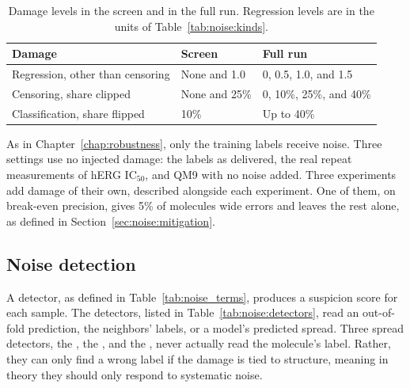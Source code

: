 \begin{table}[htbp]
\centering
\small
\begin{tabular}{@{}lll@{}}
\toprule
Damage & Screen & Full run \\
\midrule
Regression, other than censoring & None and 1.0 & 0, 0.5, 1.0, and 1.5 \\
Censoring, share clipped & None and 25\% & 0, 10\%, 25\%, and 40\% \\
Classification, share flipped & 10\% & Up to 40\% \\
\bottomrule
\end{tabular}
\caption[Damage levels.]{Damage levels in the screen and in the full run. Regression levels are in the units of Table~\ref{tab:noise:kinds}.}
\label{tab:noise:levels}
\end{table}

As in Chapter~\ref{chap:robustness}, only the training labels receive noise. Three settings use no injected damage: the labels as delivered, the real repeat measurements of hERG IC$_{50}$, and QM9 with no noise added. Three experiments add damage of their own, described alongside each experiment. One of them, on break-even precision, gives 5\% of molecules wide errors and leaves the rest alone, as defined in Section~\ref{sec:noise:mitigation}.

\subsection{Noise detection}\label{sec:noise:detection}

A detector, as defined in Table~\ref{tab:noise_terms}, produces a suspicion score for each sample. The detectors, listed in Table~\ref{tab:noise:detectors}, read an out-of-fold prediction, the neighbors' labels, or a model's predicted spread. Three spread detectors, the , the , and the , never actually read the molecule's label. Rather, they can only find a wrong label if the damage is tied to structure, meaning in theory they should only respond to systematic noise. 

